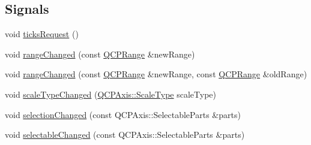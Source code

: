 \subsection*{\-Signals}
\begin{DoxyCompactItemize}
\item 
void \hyperlink{classQCPAxis_af46d99613d29518795134ec4928e3873}{ticks\-Request} ()
\item 
void \hyperlink{classQCPAxis_a0894084e4c16a1736534c4095746f910}{range\-Changed} (const \hyperlink{classQCPRange}{\-Q\-C\-P\-Range} \&new\-Range)
\item 
void \hyperlink{classQCPAxis_aac8576288e8e31f16186124bc10dd10d}{range\-Changed} (const \hyperlink{classQCPRange}{\-Q\-C\-P\-Range} \&new\-Range, const \hyperlink{classQCPRange}{\-Q\-C\-P\-Range} \&old\-Range)
\item 
void \hyperlink{classQCPAxis_a3505ed8a93bd2e349d858d84996bf767}{scale\-Type\-Changed} (\hyperlink{classQCPAxis_a36d8e8658dbaa179bf2aeb973db2d6f0}{\-Q\-C\-P\-Axis\-::\-Scale\-Type} scale\-Type)
\item 
void \hyperlink{classQCPAxis_a62b598abeee7174a05f9d542cc85b1f5}{selection\-Changed} (const \-Q\-C\-P\-Axis\-::\-Selectable\-Parts \&parts)
\item 
void \hyperlink{classQCPAxis_aa5ff1fd851139028a3bb4efcb31de9fc}{selectable\-Changed} (const \-Q\-C\-P\-Axis\-::\-Selectable\-Parts \&parts)
\end{DoxyCompactItemize}
